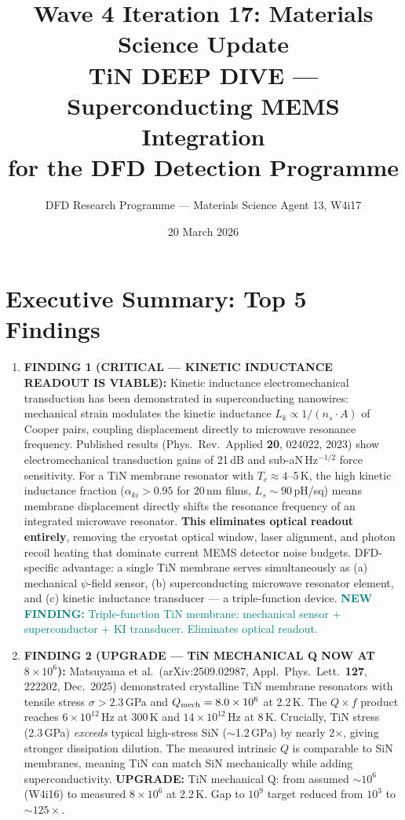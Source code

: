 \documentclass[11pt]{article}
\title{Wave 4 Iteration 17: Materials Science Update\\
\large TiN DEEP DIVE --- Superconducting MEMS Integration\\
for the DFD Detection Programme}
\author{DFD Research Programme --- Materials Science Agent 13, W4i17}
\date{20 March 2026}
\theoremstyle{remark}
\newcommand{\ee}[1]{\times 10^{#1}}
\newcommand{\newfinding}[1]{\textcolor{teal}{\textbf{NEW FINDING:} #1}}
\newcommand{\upgrade}[1]{\textcolor{blue!70!black}{\textbf{UPGRADE:} #1}}
\begin{document}
\maketitle
\tableofcontents
\newpage

\section{Executive Summary: Top 5 Findings}
\label{sec:top5}

\begin{tcolorbox}[colback=blue!5!white, colframe=blue!50!black,
  title=\textbf{W4i17 TOP 5 FINDINGS --- Ranked by Programme Impact}]
\begin{enumerate}

\item \textbf{FINDING 1 (CRITICAL --- KINETIC INDUCTANCE READOUT IS VIABLE):}
Kinetic inductance electromechanical transduction has been demonstrated
in superconducting nanowires: mechanical strain modulates the kinetic
inductance $L_k \propto 1/(n_s \cdot A)$ of Cooper pairs, coupling
displacement directly to microwave resonance frequency.
Published results (Phys.\ Rev.\ Applied \textbf{20}, 024022, 2023) show
electromechanical transduction gains of 21\,dB and sub-aN\,Hz$^{-1/2}$
force sensitivity. For a TiN membrane resonator with $T_c \approx 4$--5\,K,
the high kinetic inductance fraction ($\alpha_{ki} > 0.95$ for 20\,nm films,
$L_s \sim 90$\,pH/sq) means membrane displacement directly shifts the
resonance frequency of an integrated microwave resonator.
\textbf{This eliminates optical readout entirely}, removing the
cryostat optical window, laser alignment, and photon recoil heating
that dominate current MEMS detector noise budgets.
DFD-specific advantage: a single TiN membrane serves simultaneously as
(a) mechanical $\psi$-field sensor, (b) superconducting microwave resonator
element, and (c) kinetic inductance transducer --- a triple-function device.
\newfinding{Triple-function TiN membrane: mechanical sensor +
superconductor + KI transducer. Eliminates optical readout.}

\item \textbf{FINDING 2 (UPGRADE --- TiN MECHANICAL Q NOW AT $8\ee{6}$):}
Matsuyama et al.\ (arXiv:2509.02987, Appl.\ Phys.\ Lett.\ \textbf{127},
222202, Dec.\ 2025) demonstrated crystalline TiN membrane resonators with
tensile stress $\sigma > 2.3$\,GPa and $Q_{\rm mech} = 8.0\ee{6}$ at
2.2\,K. The $Q \times f$ product reaches $6\ee{12}$\,Hz at 300\,K and
$14\ee{12}$\,Hz at 8\,K. Crucially, TiN stress (2.3\,GPa) \emph{exceeds}
typical high-stress SiN ($\sim$1.2\,GPa) by nearly 2$\times$, giving
stronger dissipation dilution. The measured intrinsic $Q$ is comparable to
SiN membranes, meaning TiN can match SiN mechanically while adding
superconductivity.
\upgrade{TiN mechanical Q: from assumed $\sim 10^6$ (W4i16) to measured
$8\ee{6}$ at 2.2\,K. Gap to $10^9$ target reduced from $10^3$ to
$\sim 125\times$.}


\end{enumerate}
\end{tcolorbox}
\end{document}
